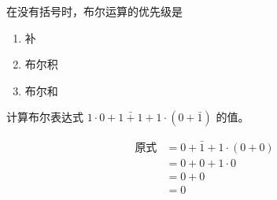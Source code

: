 在没有括号时，布尔运算的优先级是
\begin{enumerate}
    \item 补
    \item 布尔积
    \item 布尔和
\end{enumerate}

\begin{collections}
    \begin{example}
        计算布尔表达式 $1 \cdot 0 + \bar{1 + 1} + 1 \cdot (0 + \bar{1})$ 的值。
    \end{example}

    \begin{solution}
        \begin{equation*}
            \begin{aligned}
                \text{原式} &= 0 + \bar{1} + 1 \cdot (0 + 0) \\
                &= 0 + 0 + 1 \cdot 0 \\
                &= 0 + 0 \\
                &= 0 \\
            \end{aligned}
        \end{equation*}
    \end{solution}
\end{collections}
